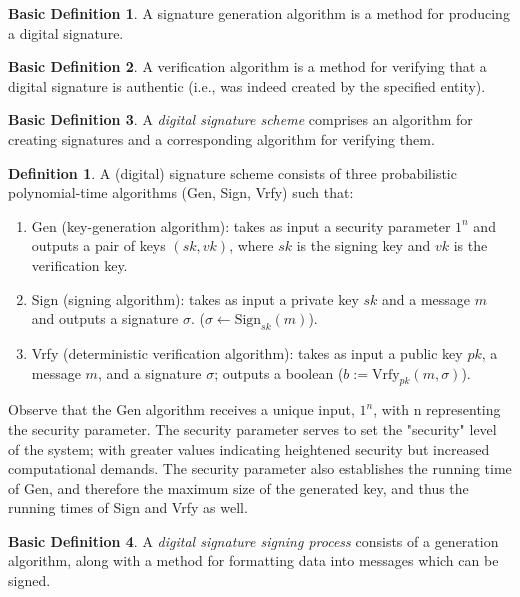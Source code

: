 \documentclass[]{final_report}
\theoremstyle{definition}
\newtheorem{definition}{Definition}[chapter]
\newtheorem{basic}{Basic Definition}
\begin{document}
\begin{basic}
A signature generation algorithm is a method for producing a digital signature.
\end{basic}

\begin{basic}
 A verification algorithm is a method for verifying that a digital signature is authentic (i.e., was indeed created by the specified entity).
\end{basic}

\begin{basic}
\label{basicDef:scheme}
A \textit{digital signature scheme} comprises an algorithm for creating signatures and a corresponding algorithm for verifying them.
\end{basic}

\begin{definition}
\label{def:digital signature}
A (digital) signature scheme consists of three probabilistic polynomial-time algorithms (Gen, Sign, Vrfy) such that:
\begin{enumerate}
    \item Gen (key-generation algorithm): takes as input a security parameter $1^n$ and outputs a pair of keys $(sk ,vk)$, where $sk$ is the signing key and $vk$ is the verification key.
    \item Sign (signing algorithm): takes as input a private key $sk$ and a message $m$ and outputs a signature $\sigma$. ($\sigma \leftarrow \text{Sign}_{sk}(m)$).
    \item Vrfy (deterministic verification algorithm):  takes as input a public key $pk$, a message $m$, and a signature $\sigma$; outputs a boolean ($b := \text{Vrfy}_{pk}(m, \sigma)$).
\end{enumerate}
\end{definition}


Observe that the Gen algorithm receives a unique input, $1^n$, with n representing the security parameter. The security parameter serves to set the "security" level of the system; with greater values indicating heightened security but increased computational demands. The security parameter also establishes the running time of Gen, and therefore the maximum size of the generated key, and thus the running times of Sign and Vrfy as well.

\begin{basic}
A \textit{digital signature signing process} consists of a generation algorithm, along with a method for formatting data into messages which can be signed.
\end{basic}
\end{document}
